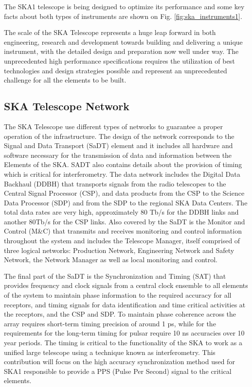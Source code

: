 
The SKA1 telescope is being designed to optimize its performance and some key facts about both types of instruments are shown on Fig. \ref{fig:ska_instruments1}. 

The scale of the SKA Telescope represents a huge leap forward in both engineering, research and development towards building and delivering a unique instrument, with the detailed design and preparation now well under way. The unprecedented high performance specifications requires the utilization of best technologies and design strategies possible and represent an unprecedented challenge for all the elements to be built. 

\subsection{SKA Telescope Network}

The SKA Telescope use different types of networks to guarantee a proper operation of the infrastructure. The design of the network corresponds to the Signal and Data Transport (SaDT) element \cite{ska:sadt_website} and it includes all hardware and software necessary for the transmission of data and information between the Elements of the SKA. SADT also contains details about the provision of timing which is critical for interferometry.
The data network includes the Digital Data Backhaul (DDBH) that transports signals from the radio telescopes to the Central Signal Processor (CSP), and data products from the CSP to the Science Data Processor (SDP) and from the SDP to the regional SKA Data Centers. The total data rates are very high, approximately 80 Tb/s for the DDBH links and another 80Tb/s for the CSP links. 
Also covered by the SaDT is the Monitor and Control (M\&C) that transmits and receives monitoring and control information throughout the system and includes the Telescope Manager, itself comprised of three logical networks: Production Network, Engineering Network and Safety Network, the Network Manager as well as local monitoring and control.

The final part of the SaDT is the Synchronization and Timing (SAT) that provides frequency and clock signals from a central clock ensemble to all elements of the system to maintain phase information to the required accuracy for all receptors, and timing signals for data identification and time critical activities at the receptors, and the CSP and SDP. To maintain phase coherence across the array requires short-term timing precision of around 1 ps, while for the requirements for the long-term timing for pulsar require 10 ns accuracies over 10 year periods. The timing is critical to the functionality of the SKA to work as a unified large telescope using a technique known as interferometry. This contribution will focus on the high accuracy synchronization method used for SKA1 responsible to provide a PPS (Pulse Per Second) signal to the critical elements. 

